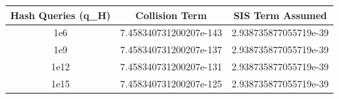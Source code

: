 \begin{tabular}{ccc}
\hline
Hash Queries (q_H) & Collision Term & SIS Term Assumed \\
\hline
1e6 & 7.458340731200207e-143 & 2.938735877055719e-39 \\
1e9 & 7.458340731200207e-137 & 2.938735877055719e-39 \\
1e12 & 7.458340731200207e-131 & 2.938735877055719e-39 \\
1e15 & 7.458340731200207e-125 & 2.938735877055719e-39 \\
\hline
\end{tabular}
